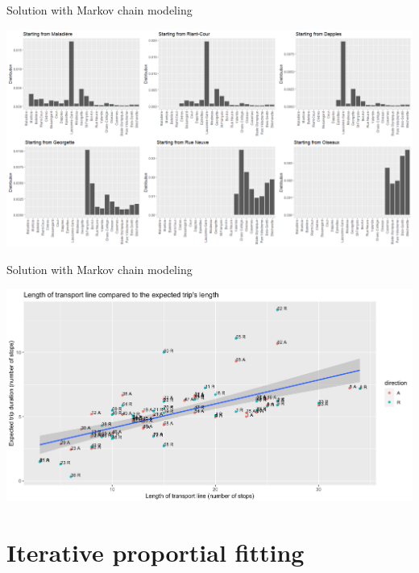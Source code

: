 \documentclass[10pt]{beamer}
\begin{document}
	\begin{frame}{Solution with Markov chain modeling}

		\begin{center}
			\includegraphics[width=\textwidth]{img/stop_distributions.png} 
		\end{center}
	
	\end{frame}
	
	
	\begin{frame}{Solution with Markov chain modeling}
		
		\begin{center}
			\includegraphics[width=\textwidth]{img/length_exp.png} 
		\end{center}
		
	\end{frame}
	
	
	\section{Iterative proportial fitting}
	
\end{document}

